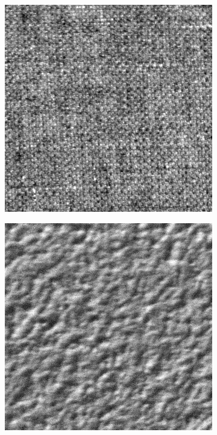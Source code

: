 \begin{figure}[H]
\begin{subfigure}{.15\textwidth}
  \centering
  \includegraphics[width=.8\linewidth]{kylberg_examples/canvas1_001.png}
\end{subfigure}
\begin{subfigure}{.15\textwidth}
  \centering
  \includegraphics[width=.8\linewidth]{kylberg_examples/ceiling1_001.png}
\end{subfigure}%
\begin{subfigure}{.15\textwidth}
  \centering

\end{subfigure}
\end{figure}
